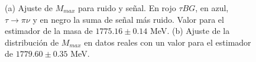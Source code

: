 \begin{figure}[h]
{\begin{minipage}[t]{0.57\textwidth}
    \end{minipage}%
  }%
  \caption{\small{(a) Ajuste de \(M_{max}\) para ruido y señal. En rojo \(\tau BG\), en azul, \(\tau \rightarrow \pi\nu \) y en negro la suma de señal más ruido. Valor para el estimador de la masa de \(1775.16\pm0.14\) MeV.  (b) Ajuste de la distribución de \(M_{max}\) en datos reales con un valor para el estimador de \(1779.60\pm0.35\) MeV.}}
  \label{fig:ajusteMmax}
\end{figure}

